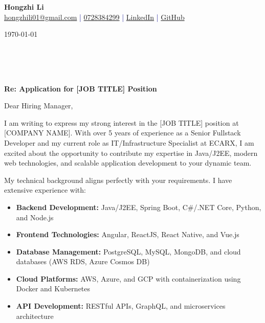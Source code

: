 \documentclass[11pt,a4paper]{article}
\begin{document}
\pagestyle{empty}

\begin{center}
{\LARGE \textbf{Hongzhi Li}}\\[8pt]
\textcolor{darkblue}{\href{mailto:hongzhili01@gmail.com}{hongzhili01@gmail.com} | \href{tel:0728384299}{0728384299} | \href{https://www.linkedin.com/in/hzl/}{LinkedIn} | \href{https://github.com/bluehawana}{GitHub}}
\end{center}

\vspace{20pt}

\noindent
\today

\vspace{15pt}

\\
[COMPANY NAME]\\
[COMPANY ADDRESS]\\
[CITY, POSTAL CODE]

\vspace{15pt}

\noindent
\textbf{Re: Application for [JOB TITLE] Position}

\vspace{15pt}

Dear Hiring Manager,

\vspace{10pt}

I am writing to express my strong interest in the [JOB TITLE] position at [COMPANY NAME]. With over 5 years of experience as a Senior Fullstack Developer and my current role as IT/Infrastructure Specialist at ECARX, I am excited about the opportunity to contribute my expertise in Java/J2EE, modern web technologies, and scalable application development to your dynamic team.

\vspace{10pt}

My technical background aligns perfectly with your requirements. I have extensive experience with:
\begin{itemize}
\item \textbf{Backend Development:} Java/J2EE, Spring Boot, C\#/.NET Core, Python, and Node.js
\item \textbf{Frontend Technologies:} Angular, ReactJS, React Native, and Vue.js
\item \textbf{Database Management:} PostgreSQL, MySQL, MongoDB, and cloud databases (AWS RDS, Azure Cosmos DB)
\item \textbf{Cloud Platforms:} AWS, Azure, and GCP with containerization using Docker and Kubernetes
\item \textbf{API Development:} RESTful APIs, GraphQL, and microservices architecture
\end{itemize}
\end{document}
